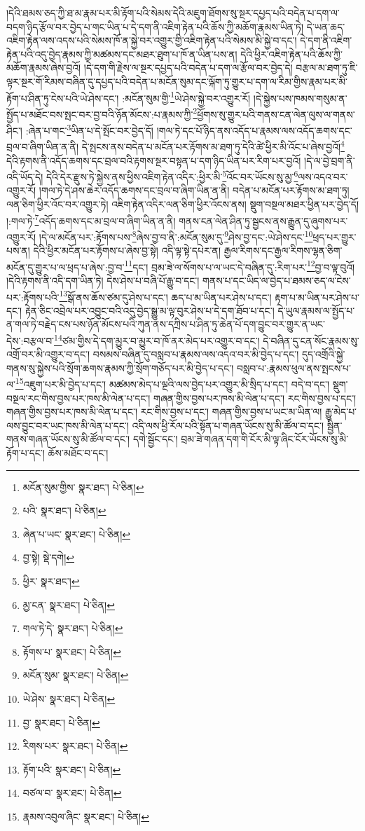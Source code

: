 །དེའི་ཐམས་ཅད་ཀྱི་ཐ་མ་རྣམ་པར་མི་རྟོག་པའི་སེམས་དེའི་མཇུག་ཐོགས་སུ་སྔར་དཔྱད་པའི་བདེན་པ་དག་ལ་བདག་ཉིད་རྩོལ་བར་བྱེད་པ་གང་ཡིན་པ་དེ་དག་ནི་འཇིག་རྟེན་པའི་ཆོས་ཀྱི་མཆོག་རྣམས་ཡིན་ཏེ། དེ་ཡན་ཆད་འཇིག་རྟེན་ལས་འདས་པའི་སེམས་ཁོ་ན་སྐྱེ་བར་འགྱུར་གྱི་འཇིག་རྟེན་པའི་སེམས་མི་སྐྱེ་བ་དང་། དེ་དག་ནི་འཇིག་རྟེན་པའི་འདུ་བྱེད་རྣམས་ཀྱི་མཚམས་དང་མཐར་ཐུག་པ་ཁོ་ན་ཡིན་པས་ན། དེའི་ཕྱིར་འཇིག་རྟེན་པའི་ཆོས་ཀྱི་མཆོག་རྣམས་ཞེས་བྱའོ། །དེ་དག་གི་རྗེས་ལ་སྔར་དཔྱད་པའི་བདེན་པ་དག་ལ་རྩོལ་བར་བྱེད་དེ། བརྩལ་མ་ཐག་ཏུ་ཇི་ལྟར་སྔར་གོ་རིམས་བཞིན་དུ་དཔྱད་པའི་བདེན་པ་མངོན་སུམ་དང་ལྐོག་ཏུ་གྱུར་པ་དག་ལ་རིམ་གྱིས་རྣམ་པར་མི་རྟོག་པ་ཤིན་ཏུ་ངེས་པའི་ཡེ་ཤེས་དང་། :མངོན་སུམ་གྱི་\footnote{མངོན་སུམ་གྱིས་  སྣར་ཐང་།  པེ་ཅིན། }ཡེ་ཤེས་སྐྱེ་བར་འགྱུར་རོ། །དེ་སྐྱེས་པས་ཁམས་གསུམ་ན་སྤྱོད་པ་མཐོང་བས་སྤང་བར་བྱ་བའི་ཉོན་མོངས་:པ་རྣམས་ཀྱི་\footnote{པའི་  སྣར་ཐང་།  པེ་ཅིན། }ཕྱོགས་སུ་གྱུར་པའི་གནས་ངན་ལེན་ལུས་ལ་གནས་ཤིང་། :ཞེན་པ་གང་\footnote{ཞེན་པ་ཡང་  སྣར་ཐང་།  པེ་ཅིན། }ཡིན་པ་དེ་སྤོང་བར་བྱེད་དོ། །གལ་ཏེ་དང་པོ་ཉིད་ནས་འདོད་པ་རྣམས་ལས་འདོད་ཆགས་དང་བྲལ་བ་ཞིག་ཡིན་ན་ནི། དེ་སྤངས་ནས་བདེན་པ་མངོན་པར་རྟོགས་མ་ཐག་ཏུ་དེའི་ཚེ་ཕྱིར་མི་འོང་པ་ཞེས་བྱའོ།\footnote{བྱ་སྟེ།  སྡེ་དགེ། } དེའི་རྟགས་ནི་འདོད་ཆགས་དང་བྲལ་བའི་རྟགས་སྔར་བསྟན་པ་དག་ཉིད་ཡིན་པར་རིག་པར་བྱའོ། །དེ་ལ་བྱེ་བྲག་ནི་འདི་ཡོད་དེ། དེའི་དེར་རྫུས་ཏེ་སྐྱེས་ནས་ཕྱིས་འཇིག་རྟེན་འདིར་:ཕྱིར་མི་\footnote{ཕྱིར་  སྣར་ཐང་། }འོང་བར་ཡོངས་སུ་མྱ་\footnote{མྱ་ངན་  སྣར་ཐང་།  པེ་ཅིན། }ལས་འདའ་བར་འགྱུར་རོ། །གལ་ཏེ་དེ་ཤས་ཆེར་འདོད་ཆགས་དང་བྲལ་བ་ཞིག་ཡིན་ན་ནི། བདེན་པ་མངོན་པར་རྟོགས་མ་ཐག་ཏུ། ལན་ཅིག་ཕྱིར་འོང་བར་འགྱུར་ཏེ། འཇིག་རྟེན་འདིར་ལན་ཅིག་ཕྱིར་འོངས་ནས། སྡུག་བསྔལ་མཐར་ཕྱིན་པར་བྱེད་དོ། །:གལ་ཏེ་\footnote{གལ་ཏེ་དེ་  སྣར་ཐང་།  པེ་ཅིན། }འདོད་ཆགས་དང་མ་བྲལ་བ་ཞིག་ཡིན་ན་ནི། གནས་ངན་ལེན་ཤིན་ཏུ་སྦྱངས་ནས་རྒྱུན་དུ་ཞུགས་པར་འགྱུར་རོ། །དེ་ལ་མངོན་པར་:རྟོགས་པས་\footnote{རྟོགས་པ་  སྣར་ཐང་།  པེ་ཅིན། }ཞེས་བྱ་བ་ནི་:མངོན་སུམ་དུ་\footnote{མངོན་སུམ་  སྣར་ཐང་།  པེ་ཅིན། }ཤེས་བྱ་དང་:ཡེ་ཤེས་དང་\footnote{ཡེ་ཤེས་  སྣར་ཐང་།  པེ་ཅིན། }ཕྲད་པར་གྱུར་པས་ན། དེའི་ཕྱིར་མངོན་པར་རྟོགས་པ་ཞེས་བྱ་སྟེ། འདི་ལྟ་སྟེ་དཔེར་ན། རྒྱལ་རིགས་དང་རྒྱལ་རིགས་ལྷན་ཅིག་མངོན་དུ་གྱུར་པ་ལ་ཕྲད་པ་ཞེས་:བྱ་བ་\footnote{བྱ་  སྣར་ཐང་།  པེ་ཅིན། }དང་། བྲམ་ཟེ་ལ་སོགས་པ་ལ་ཡང་དེ་བཞིན་དུ་:རིག་པར་\footnote{རིགས་པར་  སྣར་ཐང་།  པེ་ཅིན། }བྱ་བ་ལྟ་བུའོ། །དེའི་རྟགས་ནི་འདི་དག་ཡིན་ཏེ། དེས་ཤེས་པ་བཞི་པོ་རྒྱུ་བ་དང་། གནས་པ་དང་ཡིད་ལ་བྱེད་པ་ཐམས་ཅད་ལ་ངེས་པར་:རྟོགས་པའི་\footnote{རྟོག་པའི་  སྣར་ཐང་།  པེ་ཅིན། }སྒོ་ནས་ཆོས་ཙམ་དུ་ཤེས་པ་དང་། ཆད་པ་མ་ཡིན་པར་ཤེས་པ་དང་། རྟག་པ་མ་ཡིན་པར་ཤེས་པ་དང་། རྟེན་ཅིང་འབྲེལ་པར་འབྱུང་བའི་འདུ་བྱེད་སྒྱུ་མ་ལྟ་བུར་ཤེས་པ་དེ་དག་ཐོབ་པ་དང་། དེ་ཡུལ་རྣམས་ལ་སྤྱོད་པ་ན་གལ་ཏེ་བརྗེད་ངས་པས་ཉོན་མོངས་པའི་ཀུན་ནས་དཀྲིས་པ་ཤིན་ཏུ་ཆེན་པོ་དག་བྱུང་བར་གྱུར་ན་ཡང་དེས་:བརྩལ་བ་\footnote{བཙལ་བ་  སྣར་ཐང་།  པེ་ཅིན། }ཙམ་གྱིས་དེ་དག་མྱུར་བ་མྱུར་བ་ཁོ་ནར་མེད་པར་འགྱུར་བ་དང་། དེ་བཞིན་དུ་ངན་སོང་རྣམས་སུ་འགྲོ་བར་མི་འགྱུར་བ་དང་། བསམས་བཞིན་དུ་བསླབ་པ་རྣམས་ལས་འདའ་བར་མི་བྱེད་པ་དང་། དུད་འགྲོའི་སྐྱེ་གནས་སུ་སྐྱེས་པའི་སྲོག་ཆགས་རྣམས་ཀྱི་སྲོག་གཅོད་པར་མི་བྱེད་པ་དང་། བསླབ་པ་:རྣམས་ཕུལ་ནས་སྤངས་པ་ལ་\footnote{རྣམས་འབུལ་ཞིང་  སྣར་ཐང་།  པེ་ཅིན། }འཇུག་པར་མི་བྱེད་པ་དང་། མཚམས་མེད་པ་ལྔའི་ལས་བྱེད་པར་འགྱུར་མི་སྲིད་པ་དང་། བདེ་བ་དང་། སྡུག་བསྔལ་རང་གིས་བྱས་པར་ཁས་མི་ལེན་པ་དང་། གཞན་གྱིས་བྱས་པར་ཁས་མི་ལེན་པ་དང་། རང་གིས་བྱས་པ་དང་། གཞན་གྱིས་བྱས་པར་ཁས་མི་ལེན་པ་དང་། རང་གིས་བྱས་པ་དང་། གཞན་གྱིས་བྱས་པ་ཡང་མ་ཡིན་ལ། རྒྱུ་མེད་པ་ལས་བྱུང་བར་ཡང་ཁས་མི་ལེན་པ་དང་། འདི་ལས་ཕྱི་རོལ་པའི་སྟོན་པ་གཞན་ཡོངས་སུ་མི་ཚོལ་བ་དང་། སྦྱིན་གནས་གཞན་ཡོངས་སུ་མི་ཚོལ་བ་དང་། དགེ་སྦྱོང་དང་། བྲམ་ཟེ་གཞན་དག་གི་ངོར་མི་ལྟ་ཞིང་ངོར་ཡོངས་སུ་མི་རྟོག་པ་དང་། ཆོས་མཐོང་བ་དང་། 